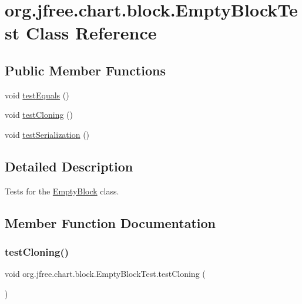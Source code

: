 \hypertarget{classorg_1_1jfree_1_1chart_1_1block_1_1_empty_block_test}{}\section{org.\+jfree.\+chart.\+block.\+Empty\+Block\+Test Class Reference}
\label{classorg_1_1jfree_1_1chart_1_1block_1_1_empty_block_test}
\subsection*{Public Member Functions}
\begin{DoxyCompactItemize}
\item 
void \mbox{\hyperlink{classorg_1_1jfree_1_1chart_1_1block_1_1_empty_block_test_aff8c78c7e7faf4380c9b6d0d7d1cf764}{test\+Equals}} ()
\item 
void \mbox{\hyperlink{classorg_1_1jfree_1_1chart_1_1block_1_1_empty_block_test_a8a6dbedaf4e0f9b0be0b5b859e781021}{test\+Cloning}} ()
\item 
void \mbox{\hyperlink{classorg_1_1jfree_1_1chart_1_1block_1_1_empty_block_test_a05ba0b905ef7fe8959d3fa0e06e4e55c}{test\+Serialization}} ()
\end{DoxyCompactItemize}


\subsection{Detailed Description}
Tests for the \mbox{\hyperlink{classorg_1_1jfree_1_1chart_1_1block_1_1_empty_block}{Empty\+Block}} class. 

\subsection{Member Function Documentation}
\mbox{\label{classorg_1_1jfree_1_1chart_1_1block_1_1_empty_block_test_a8a6dbedaf4e0f9b0be0b5b859e781021}} 
\subsubsection{\texorpdfstring{test\+Cloning()}{testCloning()}}
{\footnotesize\ttfamily void org.\+jfree.\+chart.\+block.\+Empty\+Block\+Test.\+test\+Cloning (\begin{DoxyParamCaption}{ }\end{DoxyParamCaption})}

